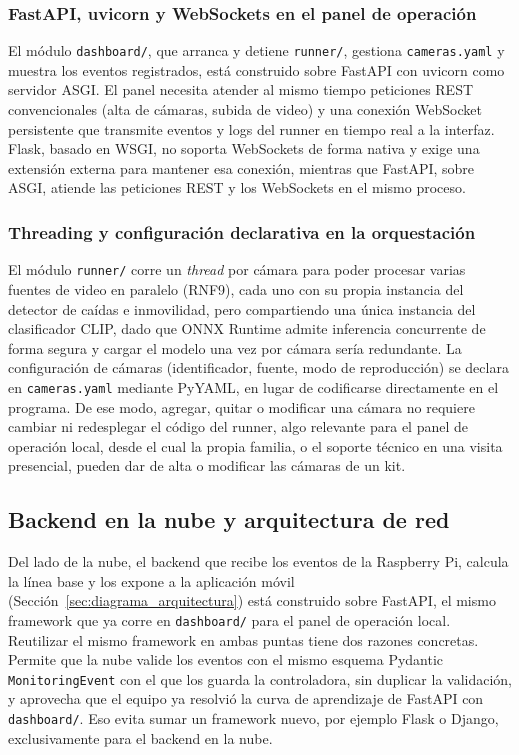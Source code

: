\subsubsection*{FastAPI, uvicorn y WebSockets en el panel de operación}
El módulo \texttt{dashboard/}, que arranca y detiene \texttt{runner/}, gestiona \texttt{cameras.yaml} y muestra los eventos registrados, está construido sobre FastAPI con uvicorn como servidor ASGI.
El panel necesita atender al mismo tiempo peticiones REST convencionales (alta de cámaras, subida de video) y una conexión WebSocket persistente que transmite eventos y logs del runner en tiempo real a la interfaz.
Flask, basado en WSGI, no soporta WebSockets de forma nativa y exige una extensión externa para mantener esa conexión, mientras que FastAPI, sobre ASGI, atiende las peticiones REST y los WebSockets en el mismo proceso.

\subsubsection*{Threading y configuración declarativa en la orquestación}
El módulo \texttt{runner/} corre un \textit{thread} por cámara para poder procesar varias fuentes de video en paralelo (RNF9), cada uno con su propia instancia del detector de caídas e inmovilidad, pero compartiendo una única instancia del clasificador CLIP, dado que ONNX Runtime admite inferencia concurrente de forma segura y cargar el modelo una vez por cámara sería redundante.
La configuración de cámaras (identificador, fuente, modo de reproducción) se declara en \texttt{cameras.yaml} mediante PyYAML, en lugar de codificarse directamente en el programa.
De ese modo, agregar, quitar o modificar una cámara no requiere cambiar ni redesplegar el código del runner, algo relevante para el panel de operación local, desde el cual la propia familia, o el soporte técnico en una visita presencial, pueden dar de alta o modificar las cámaras de un kit.

\subsection{Backend en la nube y arquitectura de red}
\label{sec:backend_nube}

Del lado de la nube, el backend que recibe los eventos de la Raspberry Pi, calcula la línea base y los expone a la aplicación móvil (Sección~\ref{sec:diagrama_arquitectura}) está construido sobre FastAPI, el mismo framework que ya corre en \texttt{dashboard/} para el panel de operación local.
Reutilizar el mismo framework en ambas puntas tiene dos razones concretas.
Permite que la nube valide los eventos con el mismo esquema Pydantic \texttt{MonitoringEvent} con el que los guarda la controladora, sin duplicar la validación, y aprovecha que el equipo ya resolvió la curva de aprendizaje de FastAPI con \texttt{dashboard/}.
Eso evita sumar un framework nuevo, por ejemplo Flask o Django, exclusivamente para el backend en la nube.

